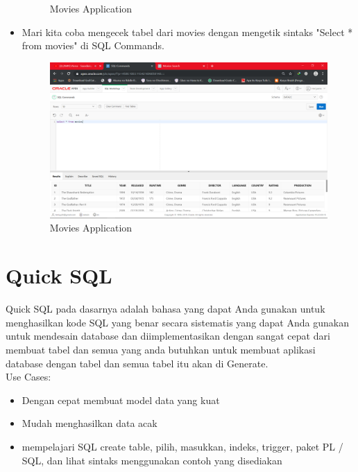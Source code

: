 \documentclass[12pt, times new roman]{article}
\begin{document}
\begin{itemize}
\begin{figure}[!htpb]
	\caption{Movies Application}
\end{figure}
\item Mari kita coba mengecek tabel dari movies dengan mengetik sintaks "Select * from movies" di SQL Commands.
\begin{figure}[!htpb]
	\centering
	\includegraphics[width=12cm]{figures/Screenshot_10.png}
	\caption{Movies Application}
\end{figure}
\end{itemize}
\section{Quick SQL}
Quick SQL pada dasarnya adalah bahasa yang dapat Anda gunakan untuk menghasilkan kode SQL yang benar secara sistematis yang dapat Anda gunakan untuk mendesain database dan diimplementasikan dengan sangat cepat dari membuat tabel dan semua yang anda butuhkan untuk membuat aplikasi database dengan tabel dan semua tabel itu akan di Generate.\\
Use Cases:
\begin{itemize}
\item Dengan cepat membuat model data yang kuat
\item Mudah menghasilkan data acak
\item mempelajari SQL create table, pilih, masukkan, indeks, trigger, paket PL / SQL, dan lihat sintaks menggunakan contoh yang disediakan  
\end{itemize}
\end{document}
